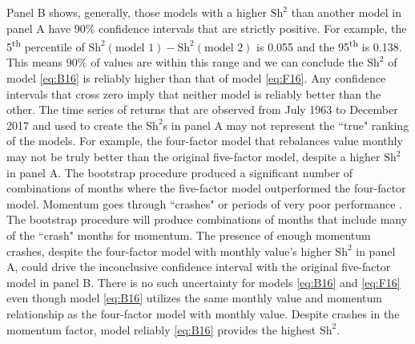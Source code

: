 Panel B shows, generally, those models with a higher $\text{Sh}^2$ than another
model in panel A have 90\% confidence intervals that are strictly positive.
For example, the 5\textsuperscript{th} percentile of
$\text{Sh}^2(\text{model 1})-\text{Sh}^2(\text{model 2})$ is 0.055 and the
95\textsuperscript{th} is 0.138.
This means 90\% of values are within this range and we
can conclude the $\text{Sh}^2$ of model \ref{eq:B16} is reliably higher
than that of model \ref{eq:F16}.
Any confidence intervals that cross zero imply that neither model is reliably
better than the other.
The time series of returns that are observed from July 1963 to December 2017
and used to create the $\text{Sh}^2$s in panel A may not represent the ``true"
ranking of the models.
For example, the four-factor model that rebalances value monthly may not be
truly better than the original five-factor model, despite a higher
$\text{Sh}^2$ in panel A.
The bootstrap procedure produced a significant number of combinations of months
where the five-factor model outperformed the four-factor model.
Momentum goes through ``crashes" or periods of very poor performance
\parencite{daniel2016momentum, barroso2015momentum}.
The bootstrap procedure will produce combinations of months that include
many of the ``crash" months for momentum.
The presence of enough momentum crashes, despite the four-factor model with
monthly value's higher $\text{Sh}^2$ 
in panel A, could drive the inconclusive confidence interval with the original
five-factor model in panel B.
There is no such uncertainty for models \ref{eq:B16} and \ref{eq:F16}
even though model \ref{eq:B16} utilizes the same monthly value and momentum
relationship as the four-factor model with monthly value.
Despite crashes in the momentum factor, model reliably \ref{eq:B16} provides
the highest $\text{Sh}^2$.

